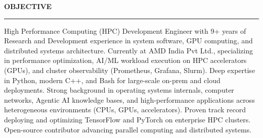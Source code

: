 \documentclass{resume} %
\renewenvironment{rSection}[1]{ %
  \sectionskip
  \textcolor{primaryColor}{\MakeUppercase{\bf #1}} %
  \sectionlineskip
  {\color{primaryColor}\hrule} %
  \begin{list}{}{ %
    \setlength{\leftmargin}{1.5em} %
  }
  \item[]
}{
  \end{list}
}
\begin{document}
\def\profile{0}


\begin{rSection}{OBJECTIVE}
{High Performance Computing (HPC) Development Engineer with 9+ years of Research and Development experience in system software, GPU computing, and distributed systems architecture. Currently at AMD India Pvt Ltd., specializing in performance optimization, AI/ML workload execution on HPC accelerators (GPUs), and cluster observability (Prometheus, Grafana, Slurm). Deep expertise in Python, modern C++, and Bash for large-scale on-prem and cloud deployments. Strong background in operating systems internals, computer networks, Agentic AI knowledge bases, and high-performance applications across heterogeneous environments (CPUs, GPUs, accelerators). Proven track record deploying and optimizing TensorFlow and PyTorch on enterprise HPC clusters. Open-source contributor advancing parallel computing and distributed systems.}

\end{rSection}




\end{document}
